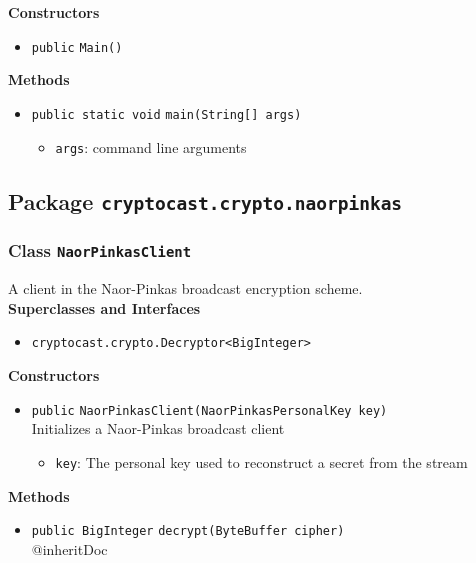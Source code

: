 \textbf{Constructors}
\begin{itemize}
\item \lstinline|public| \lstinline|Main|\lstinline|()|




\end{itemize}


\textbf{Methods}
\begin{itemize}
\item \lstinline|public static void| \lstinline|main|\lstinline|(String[] args)|

\begin{itemize}
\item \lstinline|args|: command line arguments
\end{itemize}



\end{itemize}


\subsection{Package \lstinline!cryptocast.crypto.naorpinkas!}
\subsubsection{Class \lstinline|NaorPinkasClient|}
A client in the Naor-Pinkas broadcast encryption scheme. \\


\textbf{Superclasses and Interfaces}
\begin{itemize}
\item \lstinline|cryptocast.crypto.Decryptor<BigInteger>|
\end{itemize}



\textbf{Constructors}
\begin{itemize}
\item \lstinline|public| \lstinline|NaorPinkasClient|\lstinline|(NaorPinkasPersonalKey key)|\\
Initializes a Naor-Pinkas broadcast client
\begin{itemize}
\item \lstinline|key|: The personal key used to reconstruct a secret from the stream
\end{itemize}



\end{itemize}


\textbf{Methods}
\begin{itemize}
\item \lstinline|public BigInteger| \lstinline|decrypt|\lstinline|(ByteBuffer cipher)|\\
{@inheritDoc}



\end{itemize}

